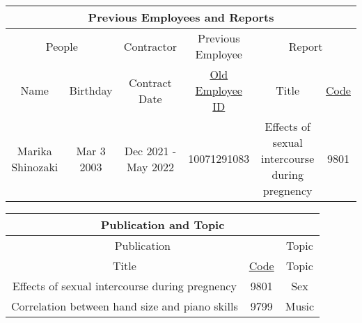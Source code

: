 \documentclass[12pt]{article}
\begin{document}
\begin{center}
    \begin{tabular}{|c|c||c||c ||c| c|}
        \hline
        \multicolumn{6}{|c|}{\cellcolor{gray!25}Previous Employees and Reports}                                                                                       \\
        \hline
        \hline
        \multicolumn{2}{|c||}{\cellcolor{gray!25}People}
                         & {\cellcolor{gray!25}Contractor}
                         & {\cellcolor{gray!25}Previous Employee}
                         & \multicolumn{2}{c|}{\cellcolor{gray!25}Report}                                                                                             \\
        \hline
        \cellcolor{gray!25} Name
                         & \cellcolor{gray!25}Birthday
                         & \cellcolor{gray!25}Contract Date
                         & \cellcolor{gray!25}\underline{Old Employee ID}
                         & \cellcolor{gray!25}Title
                         & \cellcolor{gray!25}\underline{Code}                                                                                                        \\
        \hline \hline
        Marika Shinozaki & Mar 3 2003                                     & Dec 2021 - May 2022 & 10071291083 & Effects of sexual intercourse during pregnency & 9801 \\ \hline
    \end{tabular}
\end{center}
\begin{center}
    \begin{tabular}{|c|c||c|}
        \hline
        \multicolumn{3}{|c|}{\cellcolor{gray!25}Publication and Topic}                               \\
        \hline
        \hline
        \multicolumn{2}{|c||}{\cellcolor{gray!25}Publication}
                                                       & {\cellcolor{gray!25}Topic}                  \\
        \hline
        \cellcolor{gray!25}Title
                                                       & \cellcolor{gray!25}\underline{Code}
                                                       & \cellcolor{gray!25}Topic                    \\
        \hline \hline
        Effects of sexual intercourse during pregnency & 9801                                & Sex   \\ \hline
        Correlation between hand size and piano skills & 9799                                & Music \\ \hline
    \end{tabular}
\end{center}
\end{document}

